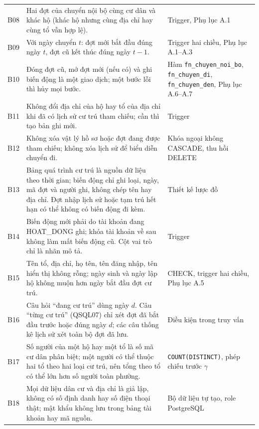 {\begin{longtable}{@{}P{1.15cm}P{8.5cm}P{4.4cm}@{}}
B08 & Hai đợt của chuyển nội bộ cùng cư dân và khác hộ (khác hộ nhưng cùng địa chỉ hay cùng tổ vẫn hợp lệ). & Trigger, Phụ lục A.1 \\
B09 & Với ngày chuyển $t$: đợt mới bắt đầu đúng ngày $t$, đợt cũ kết thúc đúng ngày $t-1$. & Trigger hai chiều, Phụ lục A.1--A.3 \\
B10 & Đóng đợt cũ, mở đợt mới (nếu có) và ghi biến động là một giao dịch; một bước lỗi thì hủy mọi bước. & Hàm \texttt{fn\_chuyen\_noi\_bo}, \texttt{fn\_chuyen\_di}, \texttt{fn\_chuyen\_den}, Phụ lục A.6--A.7 \\
B11 & Không đổi địa chỉ của hộ hay tổ của địa chỉ khi đã có lịch sử cư trú tham chiếu; cần thì tạo bản ghi mới. & Trigger \\
B12 & Không xóa vật lý hồ sơ hoặc đợt đang được tham chiếu; không xóa lịch sử để biểu diễn chuyển đi. & Khóa ngoại không CASCADE, thu hồi DELETE \\
B13 & Bảng quá trình cư trú là nguồn dữ liệu theo thời gian; biến động chỉ ghi loại, ngày, mã đợt và người ghi, không chép tên hay địa chỉ. Đợt nhập lịch sử hoặc tạm trú hết hạn có thể không có biến động đi kèm. & Thiết kế lược đồ \\
B14 & Biến động mới phải do tài khoản đang HOAT\_DONG ghi; khóa tài khoản về sau không làm mất biến động cũ. Cột vai trò chỉ là nhãn mô tả. & Trigger \\
B15 & Tên tổ, địa chỉ, họ tên, tên đăng nhập, tên hiển thị không rỗng; ngày sinh và ngày lập hộ không muộn hơn ngày bắt đầu đợt cư trú. & CHECK, trigger hai chiều, Phụ lục A.5 \\
B16 & Câu hỏi ``đang cư trú'' dùng ngày $d$. Câu ``từng cư trú'' (QSQL07) chỉ xét đợt đã bắt đầu trước hoặc đúng ngày $d$; các câu thống kê lịch sử xét toàn bộ đợt đã lưu. & Điều kiện trong truy vấn \\
B17 & Số người của một hộ hay một tổ là số mã cư dân phân biệt; một người có thể thuộc hai tổ theo hai loại cư trú, nên tổng theo tổ có thể lớn hơn số người toàn phường. & \texttt{COUNT(DISTINCT)}, phép chiếu trước $\gamma$ \\
B18 & Mọi dữ liệu dân cư và địa chỉ là giả lập, không có số định danh hay số điện thoại thật; mật khẩu không lưu trong bảng tài khoản hay mã nguồn. & Bộ dữ liệu tự tạo, role PostgreSQL \\
\end{longtable}
}

